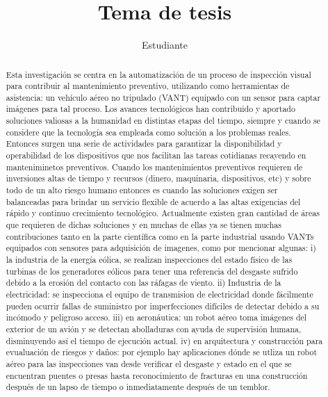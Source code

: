 \documentclass[]{report}
\title{Tema de tesis}
\author{Estudiante}
\begin{document}
	

	

\newpage\null\thispagestyle{empty}\newpage
	

\begin{abstract}
Esta investigación se centra en la automatización de un proceso de inspección visual para contribuir al mantenimiento preventivo, utilizando como herramientas de asistencia: un vehículo aéreo no tripulado (VANT) equipado con un sensor para captar imágenes para tal proceso.
Los avances tecnológicos han contribuido y aportado soluciones valiosas a la humanidad en distintas etapas del tiempo, siempre y cuando  se considere que la tecnología sea empleada como solución a los problemas reales. Entonces surgen una serie de actividades para garantizar la disponibilidad y operabilidad de los dispositivos que nos facilitan las tareas cotidianas recayendo en manteniminetos preventivos. Cuando los mantenimientos preventivos requieren de inversiones altas de tiempo y recursos (dinero, maquinaria, dispositivos, etc) y sobre todo de un alto riesgo humano entonces es cuando las soluciones exigen ser balanceadas para brindar un servicio flexible de acuerdo a las altas exigencias del rápido y continuo crecimiento tecnológico.
Actualmente existen gran cantidad de áreas que requieren de dichas soluciones y en muchas de ellas ya se tienen muchas contribuciones tanto en la parte científica como en la parte industrial usando VANTs equipados con sensores para adquisición de imagenes, como por mencionar algunas: 
i) la industria de la energía eólica, se realizan inspecciones del estado físico de las turbinas de los generadores eólicos para tener una referencia del desgaste sufrido debido a la erosión del contacto con las ráfagas de viento.
ii) Industria de la electricidad: se inspecciona el equipo de transmision de electricidad donde fácilmente pueden ocurrir fallas de suministro por imperfecciones difíciles de detectar debido a su incómodo y peligroso acceso.
iii) en aeronáutica: un robot aéreo toma imágenes del exterior de un avión y se detectan abolladuras con ayuda de supervisión humana, disminuyendo así el tiempo de ejecución actual.
iv) en arquitectura y construcción para evualuación de riesgos y daños: por ejemplo hay aplicaciones dónde se utliza un robot aéreo para  las inspecciones van desde verificar el desgaste y estado en el que se encuentran puentes o presas hasta reconocimiento de fracturas en una construcción después de un lapso de tiempo o inmediatamente después de un temblor.
\end{abstract}
\end{document}
